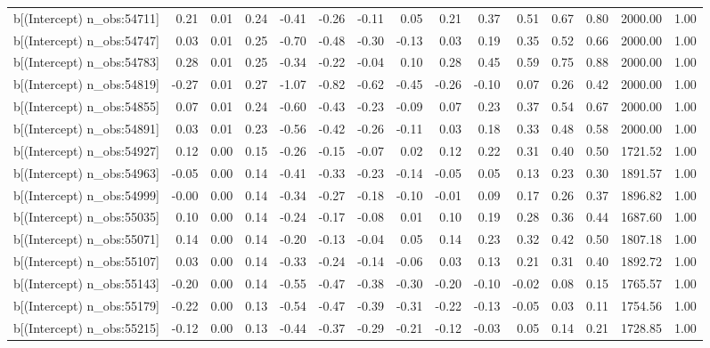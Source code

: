 \begin{table}[ht]
\begin{tabular}{rrrrrrrrrrrrrrr}
  b[(Intercept) n\_obs:54711] & 0.21 & 0.01 & 0.24 & -0.41 & -0.26 & -0.11 & 0.05 & 0.21 & 0.37 & 0.51 & 0.67 & 0.80 & 2000.00 & 1.00 \\ 
  b[(Intercept) n\_obs:54747] & 0.03 & 0.01 & 0.25 & -0.70 & -0.48 & -0.30 & -0.13 & 0.03 & 0.19 & 0.35 & 0.52 & 0.66 & 2000.00 & 1.00 \\ 
  b[(Intercept) n\_obs:54783] & 0.28 & 0.01 & 0.25 & -0.34 & -0.22 & -0.04 & 0.10 & 0.28 & 0.45 & 0.59 & 0.75 & 0.88 & 2000.00 & 1.00 \\ 
  b[(Intercept) n\_obs:54819] & -0.27 & 0.01 & 0.27 & -1.07 & -0.82 & -0.62 & -0.45 & -0.26 & -0.10 & 0.07 & 0.26 & 0.42 & 2000.00 & 1.00 \\ 
  b[(Intercept) n\_obs:54855] & 0.07 & 0.01 & 0.24 & -0.60 & -0.43 & -0.23 & -0.09 & 0.07 & 0.23 & 0.37 & 0.54 & 0.67 & 2000.00 & 1.00 \\ 
  b[(Intercept) n\_obs:54891] & 0.03 & 0.01 & 0.23 & -0.56 & -0.42 & -0.26 & -0.11 & 0.03 & 0.18 & 0.33 & 0.48 & 0.58 & 2000.00 & 1.00 \\ 
  b[(Intercept) n\_obs:54927] & 0.12 & 0.00 & 0.15 & -0.26 & -0.15 & -0.07 & 0.02 & 0.12 & 0.22 & 0.31 & 0.40 & 0.50 & 1721.52 & 1.00 \\ 
  b[(Intercept) n\_obs:54963] & -0.05 & 0.00 & 0.14 & -0.41 & -0.33 & -0.23 & -0.14 & -0.05 & 0.05 & 0.13 & 0.23 & 0.30 & 1891.57 & 1.00 \\ 
  b[(Intercept) n\_obs:54999] & -0.00 & 0.00 & 0.14 & -0.34 & -0.27 & -0.18 & -0.10 & -0.01 & 0.09 & 0.17 & 0.26 & 0.37 & 1896.82 & 1.00 \\ 
  b[(Intercept) n\_obs:55035] & 0.10 & 0.00 & 0.14 & -0.24 & -0.17 & -0.08 & 0.01 & 0.10 & 0.19 & 0.28 & 0.36 & 0.44 & 1687.60 & 1.00 \\ 
  b[(Intercept) n\_obs:55071] & 0.14 & 0.00 & 0.14 & -0.20 & -0.13 & -0.04 & 0.05 & 0.14 & 0.23 & 0.32 & 0.42 & 0.50 & 1807.18 & 1.00 \\ 
  b[(Intercept) n\_obs:55107] & 0.03 & 0.00 & 0.14 & -0.33 & -0.24 & -0.14 & -0.06 & 0.03 & 0.13 & 0.21 & 0.31 & 0.40 & 1892.72 & 1.00 \\ 
  b[(Intercept) n\_obs:55143] & -0.20 & 0.00 & 0.14 & -0.55 & -0.47 & -0.38 & -0.30 & -0.20 & -0.10 & -0.02 & 0.08 & 0.15 & 1765.57 & 1.00 \\ 
  b[(Intercept) n\_obs:55179] & -0.22 & 0.00 & 0.13 & -0.54 & -0.47 & -0.39 & -0.31 & -0.22 & -0.13 & -0.05 & 0.03 & 0.11 & 1754.56 & 1.00 \\ 
  b[(Intercept) n\_obs:55215] & -0.12 & 0.00 & 0.13 & -0.44 & -0.37 & -0.29 & -0.21 & -0.12 & -0.03 & 0.05 & 0.14 & 0.21 & 1728.85 & 1.00 \\ 

\end{tabular}
\end{table}
